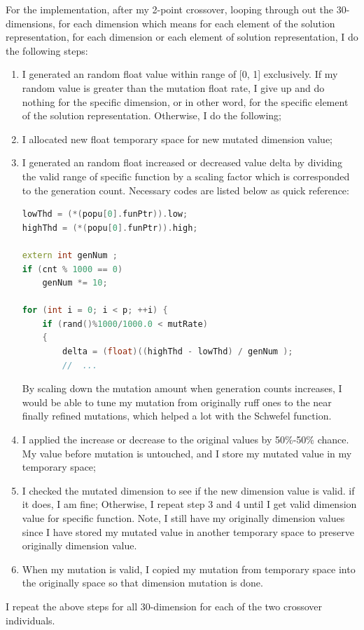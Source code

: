 \documentclass[b5paper,11pt, abstraction, titlepage]{scrartcl}
\begin{document}
\begin{CJK}{UTF8}{gbsn}
For the implementation, after my 2-point crossover, looping through out the 30-dimensions, for each dimension which means for each element of the solution representation, for each dimension or each element of solution representation, I do the following steps:
\begin{enumerate}
  \itemsep=-3pt
\item I generated an random float value within range of [0, 1] exclusively. If my random value is greater than the mutation float rate, I give up and do nothing for the specific dimension, or in other word, for the specific element of the solution representation. Otherwise, I do the following;
\item I allocated new float temporary space for new mutated dimension value;
  
\item I generated an random float increased or decreased value delta by dividing the valid range of specific function by a scaling factor which is corresponded to the generation count. Necessary codes are listed below as quick reference:
\begin{lstlisting}[language=c++]
lowThd = (*(popu[0].funPtr)).low;
highThd = (*(popu[0].funPtr)).high;

extern int genNum ;
if (cnt % 1000 == 0)  
    genNum *= 10;    

for (int i = 0; i < p; ++i) {
    if (rand()%1000/1000.0 < mutRate) 
    {
        delta = (float)((highThd - lowThd) / genNum );
        //  ...
\end{lstlisting}
  By scaling down the mutation amount when generation counts increases, I would be able to tune my mutation from originally ruff ones to the near finally refined mutations, which helped a lot with the Schwefel function.

\item I applied the increase or decrease to the original values by 50\%-50\% chance. My value before mutation is untouched, and I store my mutated value in my temporary space;
\item I checked the mutated dimension to see if the new dimension value is valid. if it does, I am fine; Otherwise, I repeat step 3 and 4 until I get valid dimension value for specific function. Note, I still have my originally dimension values since I have stored my mutated value in another temporary space to preserve originally dimension value.

\item When my mutation is valid, I copied my mutation from temporary space into the originally space so that dimension mutation is done.
\end{enumerate}
I repeat the above steps for all 30-dimension for each of the two crossover individuals.


\end{CJK}
\end{document}
